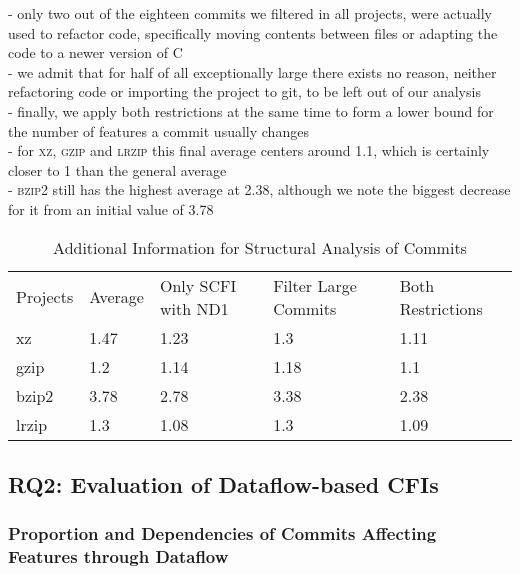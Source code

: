 - only two out of the eighteen commits we filtered in all projects, were actually used to refactor code, specifically moving contents between files or adapting the code to a newer version of C \\
- we admit that for half of all exceptionally large there exists no reason, neither refactoring code or importing the project to git, to be left out of our analysis \\
- finally, we apply both restrictions at the same time to form a lower bound for the number of features a commit usually changes \\
- for \textsc{xz}, \textsc{gzip} and \textsc{lrzip} this final average centers around 1.1, which is certainly closer to 1 than the general average \\
- \textsc{bzip2} still has the highest average at 2.38, although we note the biggest decrease for it from an initial value of 3.78 \\

\begin{table}[t]
\caption{Additional Information for Structural Analysis of Commits}
\label{tab:commit_sfbr_table}
\begin{tabular}{lllll}
 Projects & Average & Only SCFI with ND1 & Filter Large Commits & Both Restrictions \\
  xz    & 1.47 & 1.23 & 1.3  & 1.11 \\
  gzip  & 1.2  & 1.14 & 1.18 & 1.1 \\
  bzip2 & 3.78 & 2.78 & 3.38 & 2.38 \\
  lrzip & 1.3  & 1.08 & 1.3  & 1.09 \\
\end{tabular}
\end{table}

\subsection*{\textbf{RQ2: Evaluation of Dataflow-based CFIs}}\label{sec:eval_df_cfis}

\subsubsection*{Proportion and Dependencies of Commits Affecting Features through Dataflow}\label{sec:eval_commit_dfbr}

